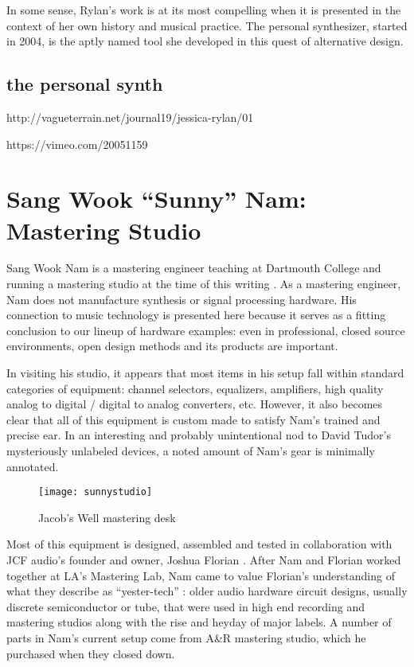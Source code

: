 In some sense, Rylan's work is at its most compelling when it is presented in the context of her own history and musical practice. The personal synthesizer, started in 2004, is the aptly named tool she developed in this quest of alternative design. 

\subsection{the personal synth}

http://vagueterrain.net/journal19/jessica-rylan/01

https://vimeo.com/20051159



\section{Sang Wook ``Sunny'' Nam: Mastering Studio}

Sang Wook Nam is a mastering engineer teaching at Dartmouth College and running a mastering studio at the time of this writing \cite{nam2015}. As a mastering engineer, Nam does not manufacture synthesis or signal processing hardware. His connection to music technology is presented here because it serves as a fitting conclusion to our lineup of hardware examples: even in professional, closed source environments, open design methods and its products are important. 

In visiting his studio, it appears that most items in his setup fall within standard categories of equipment: channel selectors, equalizers, amplifiers, high quality analog to digital / digital to analog converters, etc. However, it also becomes clear that all of this equipment is custom made to satisfy Nam's trained and precise ear. In an interesting and probably unintentional nod to David Tudor's mysteriously unlabeled devices, a noted amount of Nam's gear is minimally annotated. 

	\begin{figure}[h!]
	  \caption{Jacob's Well mastering desk}
	  \centering
	    \texttt{[image: sunnystudio]}
	\end{figure}
	
Most of this equipment is designed, assembled and tested in collaboration with JCF audio's founder and owner, Joshua Florian \cite{florian2015}. After Nam and Florian worked together at LA's Mastering Lab, Nam came to value Florian's understanding of what they describe as ``yester-tech'' \cite{florian2015b}: older audio hardware circuit designs, usually discrete semiconductor or tube, that were used in high end recording and mastering studios along with the rise and heyday of major labels. A number of parts in Nam's current setup come from A\&R mastering studio, which he purchased when they closed down. 



